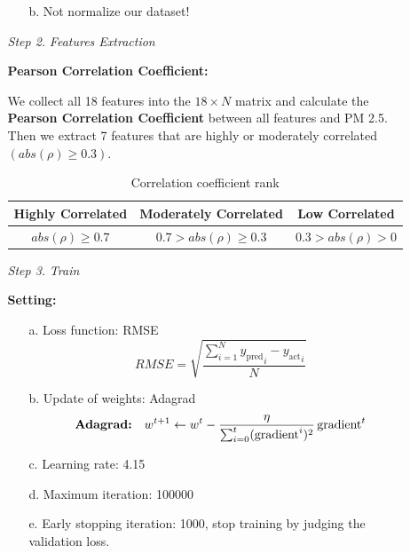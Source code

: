 \documentclass[a4paper,11pt]{article}
\begin{document}
\begin{enumerate}
\begin{enumerate}
\begin{enumerate}
				\item [b.] Not normalize our dataset!\\
			\end{enumerate}

		\item [\textit{Step 2.}] \textit{Features Extraction}

		\textbf{Pearson Correlation Coefficient:}

		We collect all 18 features into the $18 \times N$ matrix and calculate the \textbf{Pearson Correlation Coefficient} between all features and PM 2.5. Then we extract 7 features that are highly or moderately correlated $(abs(\rho) \geq 0.3)$.\\

		\begin{table}[htp]
			\begin{center}
				\begin{tabular}{ | c | c | c | }
				  	\hline
			  		Highly Correlated &  Moderately Correlated & Low Correlated\\[0.5ex] 
			  		\hline \hline
			  		$abs(\rho) \geq 0.7 $& $0.7 > abs(\rho) \geq 0.3$ & $0.3 > abs(\rho) > 0$\\[0.2ex]
			  		\hline
				\end{tabular}
				\caption{Correlation coefficient rank}
			\end{center}
		\end{table}


		\item [\textit{Step 3.}] \textit{Train}

		\textbf{Setting:}
			\begin{enumerate}
				\item [a.] Loss function: RMSE
					$$RMSE = \sqrt{\frac{\sum_{i = 1}^N {y_{\text{pred}}}_i - {y_{\text{act}}}_i}{N}}$$

				\item [b.] Update of weights: Adagrad
					$$\text{\textbf{Adagrad:}}
					\quad w^{t+1} \leftarrow w^t - \frac{\eta}{\sum_{i = 0}^t (\text{gradient}^i)^2}\,\text{gradient}^t$$

				\item [c.] Learning rate: 4.15

				\item [d.] Maximum iteration: 100000

				\item [e.] Early stopping iteration: 1000, stop training by judging the validation loss.\\


\end{enumerate}
\end{enumerate}
\end{enumerate}
\end{document}
